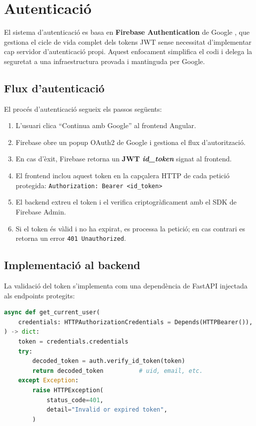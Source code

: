 \documentclass[12pt,a4paper]{article}
\begin{document}
\section{Autenticació}

El sistema d'autenticació es basa en \textbf{Firebase Authentication} de Google \cite{firebase2024auth}, que gestiona el cicle de vida complet dels tokens JWT sense necessitat d'implementar cap servidor d'autenticació propi. Aquest enfocament simplifica el codi i delega la seguretat a una infraestructura provada i mantinguda per Google.

\subsection{Flux d'autenticació}

El procés d'autenticació segueix els passos següents:

\begin{enumerate}
    \item L'usuari clica ``Continua amb Google'' al frontend Angular.
    \item Firebase obre un popup OAuth2 de Google i gestiona el flux d'autorització.
    \item En cas d'èxit, Firebase retorna un \textbf{JWT \textit{id\_token}} signat al frontend.
    \item El frontend inclou aquest token en la capçalera HTTP de cada petició protegida:
          \texttt{Authorization: Bearer <id\_token>}
    \item El backend extreu el token i el verifica criptogràficament amb el SDK de Firebase Admin.
    \item Si el token és vàlid i no ha expirat, es processa la petició; en cas contrari es retorna un error \texttt{401 Unauthorized}.
\end{enumerate}

\subsection{Implementació al backend}

La validació del token s'implementa com una dependència de FastAPI injectada als endpoints protegits:

\begin{lstlisting}[language=Python, caption=Dependència d'autenticació (FastAPI)]
async def get_current_user(
    credentials: HTTPAuthorizationCredentials = Depends(HTTPBearer()),
) -> dict:
    token = credentials.credentials
    try:
        decoded_token = auth.verify_id_token(token)
        return decoded_token          # uid, email, etc.
    except Exception:
        raise HTTPException(
            status_code=401,
            detail="Invalid or expired token",
        )
\end{lstlisting}
\end{document}

